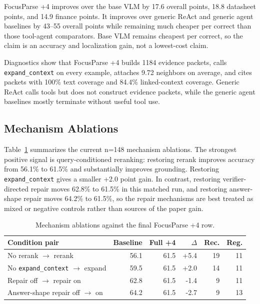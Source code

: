 \documentclass[10pt]{article}
\begin{document}
FocusParse +4 improves over the base VLM by 17.6 overall points, 18.8
datasheet points, and 14.9 finance points. It improves over generic ReAct and
generic agent baselines by 43--55 overall points while remaining much cheaper
per correct than those tool-agent comparators. Base VLM remains cheapest per
correct, so the claim is an accuracy and localization gain, not a lowest-cost
claim.

Diagnostics show that FocusParse +4 builds 1184 evidence packets, calls
\texttt{expand\_context} on every example, attaches 9.72 neighbors on average,
and cites packets with 100\% text coverage and 84.4\% linked-context coverage.
Generic ReAct calls tools but does not construct evidence packets, while the
generic agent baselines mostly terminate without useful tool use.

\subsection{Mechanism Ablations}

Table~\ref{tab:ablations} summarizes the current n=148 mechanism ablations.
The strongest positive signal is query-conditioned reranking: restoring rerank
improves accuracy from 56.1\% to 61.5\% and substantially improves grounding.
Restoring \texttt{expand\_context} gives a smaller +2.0 point gain. In contrast,
restoring verifier-directed repair moves 62.8\% to 61.5\% in this matched run,
and restoring answer-shape repair moves 64.2\% to 61.5\%, so the repair
mechanisms are best treated as mixed or negative controls rather than sources of
the paper gain.

\begin{table}[t]
\centering
\caption{Mechanism ablations against the final FocusParse +4 row.}
\label{tab:ablations}
\small
\begin{tabular}{lrrrrr}
\toprule
Condition pair & Baseline & Full +4 & $\Delta$ & Rec. & Reg. \\
\midrule
No rerank $\rightarrow$ rerank & 56.1 & 61.5 & +5.4 & 19 & 11 \\
No \texttt{expand\_context} $\rightarrow$ expand & 59.5 & 61.5 & +2.0 & 14 & 11 \\
Repair off $\rightarrow$ repair on & 62.8 & 61.5 & -1.4 & 9 & 11 \\
Answer-shape repair off $\rightarrow$ on & 64.2 & 61.5 & -2.7 & 9 & 13 \\
\bottomrule
\end{tabular}
\end{table}
\end{document}
